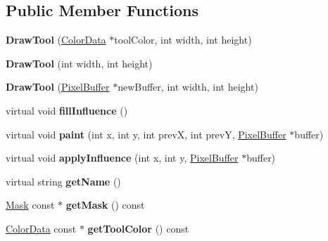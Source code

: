 \subsection*{Public Member Functions}
\begin{DoxyCompactItemize}
\item 
\hypertarget{classDrawTool_aa21e3a5373ba9e4e43d6e56eec82b32d}{{\bfseries Draw\-Tool} (\hyperlink{classColorData}{Color\-Data} $\ast$tool\-Color, int width, int height)}\label{classDrawTool_aa21e3a5373ba9e4e43d6e56eec82b32d}

\item 
\hypertarget{classDrawTool_aa1816d6699a835d9c7619ee5c97be9d1}{{\bfseries Draw\-Tool} (int width, int height)}\label{classDrawTool_aa1816d6699a835d9c7619ee5c97be9d1}

\item 
\hypertarget{classDrawTool_a521ad2f183dd3354de1dd163140e8b1d}{{\bfseries Draw\-Tool} (\hyperlink{classPixelBuffer}{Pixel\-Buffer} $\ast$new\-Buffer, int width, int height)}\label{classDrawTool_a521ad2f183dd3354de1dd163140e8b1d}

\item 
\hypertarget{classDrawTool_ae202bc193ba721452e81f34b6c2e6e35}{virtual void {\bfseries fill\-Influence} ()}\label{classDrawTool_ae202bc193ba721452e81f34b6c2e6e35}

\item 
\hypertarget{classDrawTool_a65dbb2f006efc9c6053d01df75eff5a9}{virtual void {\bfseries paint} (int x, int y, int prev\-X, int prev\-Y, \hyperlink{classPixelBuffer}{Pixel\-Buffer} $\ast$buffer)}\label{classDrawTool_a65dbb2f006efc9c6053d01df75eff5a9}

\item 
\hypertarget{classDrawTool_ac60a70d91e81163d413b99382ac4255b}{virtual void {\bfseries apply\-Influence} (int x, int y, \hyperlink{classPixelBuffer}{Pixel\-Buffer} $\ast$buffer)}\label{classDrawTool_ac60a70d91e81163d413b99382ac4255b}

\item 
\hypertarget{classDrawTool_a11a450d969098c86158b6ec5f14d291e}{virtual string {\bfseries get\-Name} ()}\label{classDrawTool_a11a450d969098c86158b6ec5f14d291e}

\item 
\hypertarget{classDrawTool_ad11d4e44fcd2caf774e18ce5b2986865}{\hyperlink{classMask}{Mask} const $\ast$ {\bfseries get\-Mask} () const }\label{classDrawTool_ad11d4e44fcd2caf774e18ce5b2986865}

\item 
\hypertarget{classDrawTool_a00485271784acd5acc75840a7a17eb2e}{\hyperlink{classColorData}{Color\-Data} const $\ast$ {\bfseries get\-Tool\-Color} () const }\label{classDrawTool_a00485271784acd5acc75840a7a17eb2e}


\end{DoxyCompactItemize}
